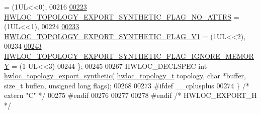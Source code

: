 \begin{DoxyCode}
       = (1UL<<0),
00216 
\hyperlink{a00207_gga7ac6f97cc40bd50c40285084f869ba63aaa2702ffba050bab079b3041aec737d4}{00223}  \hyperlink{a00207_gga7ac6f97cc40bd50c40285084f869ba63aaa2702ffba050bab079b3041aec737d4}{HWLOC\_TOPOLOGY\_EXPORT\_SYNTHETIC\_FLAG\_NO\_ATTRS} = (1UL<<1),
00224 
\hyperlink{a00207_gga7ac6f97cc40bd50c40285084f869ba63a7896bdf4ccfcdcd09a9f76c0f5e3a5b8}{00233}  \hyperlink{a00207_gga7ac6f97cc40bd50c40285084f869ba63a7896bdf4ccfcdcd09a9f76c0f5e3a5b8}{HWLOC\_TOPOLOGY\_EXPORT\_SYNTHETIC\_FLAG\_V1} = (1UL<<2),
00234 
\hyperlink{a00207_gga7ac6f97cc40bd50c40285084f869ba63a22c57cf18e1da4a6c584fb783b552f9f}{00243}  \hyperlink{a00207_gga7ac6f97cc40bd50c40285084f869ba63a22c57cf18e1da4a6c584fb783b552f9f}{HWLOC\_TOPOLOGY\_EXPORT\_SYNTHETIC\_FLAG\_IGNORE\_MEMORY} = (1
      UL<<3)
00244 \};
00245 
00267   HWLOC\_DECLSPEC \textcolor{keywordtype}{int} \hyperlink{a00207_ga24b7864a1c588309c4749f621f03b4c7}{hwloc\_topology\_export\_synthetic}(
      \hyperlink{a00186_ga9d1e76ee15a7dee158b786c30b6a6e38}{hwloc\_topology\_t} topology, \textcolor{keywordtype}{char} *buffer, \textcolor{keywordtype}{size\_t} buflen, \textcolor{keywordtype}{unsigned} \textcolor{keywordtype}{long} flags);
00268 
00273 \textcolor{preprocessor}{#ifdef \_\_cplusplus}
00274 \} \textcolor{comment}{/* extern "C" */}
00275 \textcolor{preprocessor}{#endif}
00276 
00277 
00278 \textcolor{preprocessor}{#endif }\textcolor{comment}{/* HWLOC\_EXPORT\_H */}\textcolor{preprocessor}{}
\end{DoxyCode}
